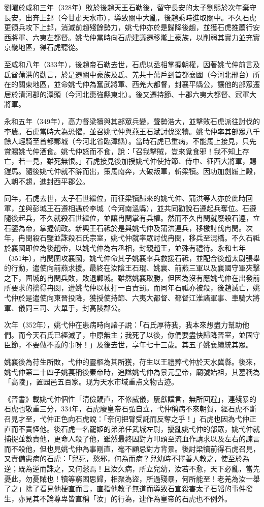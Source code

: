 劉曜於咸和三年（328年）敗於後趙天王石勒後，留守長安的太子劉熙於次年棄守長安，出奔上邽（今甘肅天水市），導致關中大亂，後趙乘時進取關中。不久石虎更領兵攻下上邽，消滅前趙殘餘勢力，姚弋仲亦於是歸降後趙，並獲石虎推薦行安西將軍、六夷左都督。姚弋仲當時向石虎建議遷移隴上豪族，以削弱其實力並充實京畿地區，得石虎聽從。

至咸和八年（333年），後趙帝石勒去世，石虎以丞相掌握朝權，因著姚弋仲前言及氐酋蒲洪的勸言，於是遷關中豪族及氐、羌共十萬戶到首都襄國（今河北邢台）所在的關東地區，並命姚弋仲為奮武將軍、西羌大都督，封襄平縣公，讓他的部眾遷居於清河郡的灄頭（今河北棗強縣東北）。後又遷持節、十郡六夷大都督、冠軍大將軍。

永和五年（349年），高力督梁犢與其部眾兵變，聲勢浩大，並擊敗石虎派往討伐的李農。石虎當時大為恐懼，並召姚弋仲與燕王石斌討伐梁犢。姚弋仲率其部眾八千餘人輕騎至首都鄴城（今河北省臨漳縣）。當時石虎已重病，不能馬上接見，只先賞賜姚弋仲酒食。姚弋仲怒而不食，說：「召我擊賊，豈來覓食邪！我不知上存亡，若一見，雖死無恨。」石虎接見後加授姚弋仲使持節、侍中、征西大將軍，賜鎧馬。隨後姚弋仲就不辭而出，策馬南奔，大破叛軍，斬梁犢。因功加劍履上殿，入朝不趨，進封西平郡公。

同年，石虎去世，太子石世繼位，而征梁犢歸來的姚弋仲、蒲洪等人亦於此時回軍，並與彭城王石遵相遇於李城（今河南溫縣），並共同勸說石遵起兵奪位。石遵隨後起兵，不久就殺石世繼位，並讓冉閔掌有兵權。然而不久冉閔就廢殺石遵，立石鑒為帝，掌握朝政。新興王石祗於是與姚弋仲及蒲洪連兵，移檄討伐冉閔。次年，冉閔殺石鑒並誅殺石氏宗室，姚弋仲就率眾討伐冉閔，移兵至混橋。不久石祗於襄國即位為後趙帝，以姚弋仲為右丞相，封親趙王，並殊有禮待。永和七年（351年），冉閔圍攻襄國，姚弋仲命其子姚襄率兵救援石祗，並配合後趙太尉張舉的行動，遣使向前燕求援。最終在汝陰王石琨、姚襄、前燕三軍以及襄國守軍夾擊之下，圍城的冉閔兵敗，敗退鄴城。雖然姚襄取勝，但因為沒有應姚弋仲在出發前所要求的擒得冉閔，遭姚弋仲以杖打一百責罰。而同年石祗亦被殺，後趙滅亡，姚弋仲於是遣使向東晉投降，獲授使持節、六夷大都督、都督江淮諸軍事、車騎大將軍、儀同三司、大單于，封高陵郡公。

次年（352年），姚弋仲在患病時向諸子說：「石氏厚待我，我本來想盡力幫助他們。而今天石氏已經滅了，中原無主；我死了以後，你們要盡快歸降晉室，並固守臣節，不要做不義的事呀！」及後去世，享年七十三歲。其五子姚襄續統其眾。

姚襄後為苻生所敗，弋仲的靈柩為其所獲，苻生以王禮葬弋仲於天水冀縣。後來，姚弋仲第二十四子姚萇稱後秦帝時，追諡姚弋仲為景元皇帝，廟號始祖，其墓稱為「高陵」，置园邑五百家。现为天水市域重点文物古迹。

《晉書》載姚弋仲個性「清儉鯁直，不修威儀，屢獻讜言，無所回避」，連殘暴的石虎也敬重三分，334年，石虎廢皇帝石弘自立，弋仲稱病不來朝賀，經石虎不斷召見才至，弋仲正色向石虎說：「奈何把臂受託而反奪之乎！」石虎也因為弋仲正直而不責怪他。後石虎一名寵姬的弟弟任武城左尉，擾亂姚弋仲的部眾，姚弋仲就捕捉並數責他，更命人殺了他，雖然最終因對方叩頭至流血作請求以及左右的諫言而不殺他，但也見姚弋仲為事剛直，毫不顧忌對方背景。後討梁犢前得石虎召見，又責備患病的石虎：「兒死，愁邪，何為而病？兒幼時不擇善人教之，使至於為逆；既為逆而誅之，又何愁焉！且汝久病，所立兒幼，汝若不愈，天下必亂，當先憂此，勿憂賊也！犢等窮困思歸，相聚為盜，所過殘暴，何所能至！老羌為汝一舉了之」除了看見他梗直而言，直指他教子無道而導致石宣殺害太子石韜的事件發生，亦見其不論尊卑皆直稱「汝」的行為，連作為皇帝的石虎也不例外。

